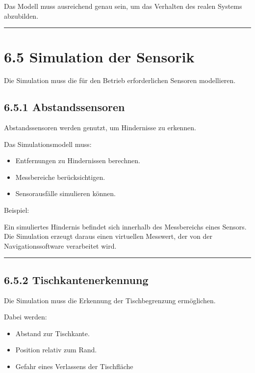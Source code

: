 \documentclass[
  a4paper,
  12pt,
  DIV=12,        %
  parskip=half,  %
  headings=small %
]{scrartcl}
\theoremstyle{definition}
\providecommand{\tightlist}{%
  \setlength{\itemsep}{0pt}\setlength{\parskip}{0pt}}
\theoremstyle{definition}
\providecommand{\tightlist}{%
  \setlength{\itemsep}{0pt}\setlength{\parskip}{0pt}}
\begin{document}
Das Modell muss ausreichend genau sein, um das Verhalten des realen
Systems abzubilden.

\begin{center}\rule{0.5\linewidth}{0.5pt}\end{center}

\section{6.5 Simulation der Sensorik}\label{simulation-der-sensorik}

Die Simulation muss die für den Betrieb erforderlichen Sensoren
modellieren.

\subsection{6.5.1 Abstandssensoren}\label{abstandssensoren}

Abstandssensoren werden genutzt, um Hindernisse zu erkennen.

Das Simulationsmodell muss:

\begin{itemize}
\tightlist
\item
  Entfernungen zu Hindernissen berechnen.
\item
  Messbereiche berücksichtigen.
\item
  Sensorausfälle simulieren können.
\end{itemize}

Beispiel:

Ein simuliertes Hindernis befindet sich innerhalb des Messbereichs eines
Sensors. Die Simulation erzeugt daraus einen virtuellen Messwert, der
von der Navigationssoftware verarbeitet wird.

\begin{center}\rule{0.5\linewidth}{0.5pt}\end{center}

\subsection{6.5.2 Tischkantenerkennung}\label{tischkantenerkennung-1}

Die Simulation muss die Erkennung der Tischbegrenzung ermöglichen.

Dabei werden:

\begin{itemize}
\tightlist
\item
  Abstand zur Tischkante.
\item
  Position relativ zum Rand.
\item
  Gefahr eines Verlassens der Tischfläche
\end{itemize}
\end{document}
